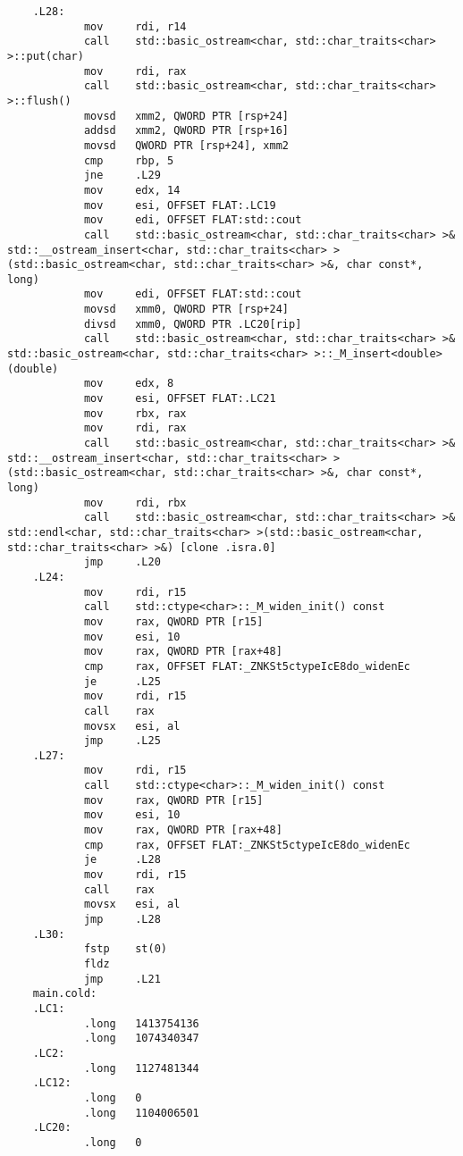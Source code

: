 \documentclass[12pt,a4paper]{article}
\numberwithin{subsection}{section}
\begin{document}
\begin{lstlisting}
    .L28:
            mov     rdi, r14
            call    std::basic_ostream<char, std::char_traits<char> >::put(char)
            mov     rdi, rax
            call    std::basic_ostream<char, std::char_traits<char> >::flush()
            movsd   xmm2, QWORD PTR [rsp+24]
            addsd   xmm2, QWORD PTR [rsp+16]
            movsd   QWORD PTR [rsp+24], xmm2
            cmp     rbp, 5
            jne     .L29
            mov     edx, 14
            mov     esi, OFFSET FLAT:.LC19
            mov     edi, OFFSET FLAT:std::cout
            call    std::basic_ostream<char, std::char_traits<char> >& std::__ostream_insert<char, std::char_traits<char> >(std::basic_ostream<char, std::char_traits<char> >&, char const*, long)
            mov     edi, OFFSET FLAT:std::cout
            movsd   xmm0, QWORD PTR [rsp+24]
            divsd   xmm0, QWORD PTR .LC20[rip]
            call    std::basic_ostream<char, std::char_traits<char> >& std::basic_ostream<char, std::char_traits<char> >::_M_insert<double>(double)
            mov     edx, 8
            mov     esi, OFFSET FLAT:.LC21
            mov     rbx, rax
            mov     rdi, rax
            call    std::basic_ostream<char, std::char_traits<char> >& std::__ostream_insert<char, std::char_traits<char> >(std::basic_ostream<char, std::char_traits<char> >&, char const*, long)
            mov     rdi, rbx
            call    std::basic_ostream<char, std::char_traits<char> >& std::endl<char, std::char_traits<char> >(std::basic_ostream<char, std::char_traits<char> >&) [clone .isra.0]
            jmp     .L20
    .L24:
            mov     rdi, r15
            call    std::ctype<char>::_M_widen_init() const
            mov     rax, QWORD PTR [r15]
            mov     esi, 10
            mov     rax, QWORD PTR [rax+48]
            cmp     rax, OFFSET FLAT:_ZNKSt5ctypeIcE8do_widenEc
            je      .L25
            mov     rdi, r15
            call    rax
            movsx   esi, al
            jmp     .L25
    .L27:
            mov     rdi, r15
            call    std::ctype<char>::_M_widen_init() const
            mov     rax, QWORD PTR [r15]
            mov     esi, 10
            mov     rax, QWORD PTR [rax+48]
            cmp     rax, OFFSET FLAT:_ZNKSt5ctypeIcE8do_widenEc
            je      .L28
            mov     rdi, r15
            call    rax
            movsx   esi, al
            jmp     .L28
    .L30:
            fstp    st(0)
            fldz
            jmp     .L21
    main.cold:
    .LC1:
            .long   1413754136
            .long   1074340347
    .LC2:
            .long   1127481344
    .LC12:
            .long   0
            .long   1104006501
    .LC20:
            .long   0    
\end{lstlisting}
\end{document}
